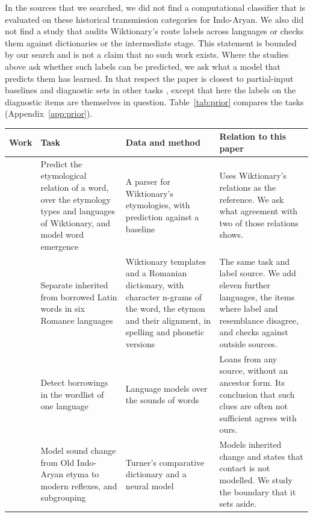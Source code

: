 \documentclass[11pt]{article}
\begin{document}
In the sources that we searched, we did not find a computational classifier that is evaluated on these historical transmission categories for Indo-Aryan. We also did not find a study that audits Wiktionary's route labels across languages or checks them against dictionaries or the intermediate stage. This statement is bounded by our search and is not a claim that no such work exists. Where the studies above ask whether such labels can be predicted, we ask what a model that predicts them has learned. In that respect the paper is closest to partial-input baselines and diagnostic sets in other tasks \citep{poliak2018hypothesis,mccoy2019right}, except that here the labels on the diagnostic items are themselves in question. Table~\ref{tab:prior} compares the tasks (Appendix~\ref{app:prior}).

\begin{table}[t]
\centering\footnotesize
\begin{tabular}{p{}p{}p{}p{}}
\toprule
\textbf{Work} & \textbf{Task} & \textbf{Data and method} & \textbf{Relation to this paper} \\
\midrule
\citet{wu2020computational} & Predict the etymological relation of a word, over the etymology types and languages of Wiktionary, and model word emergence & A parser for Wiktionary's etymologies, with prediction against a baseline & Uses Wiktionary's relations as the reference. We ask what agreement with two of those relations shows. \\
\addlinespace
\citet{cristea2021inherited} & Separate inherited from borrowed Latin words in six Romance languages & Wiktionary templates and a Romanian dictionary, with character n-grams of the word, the etymon and their alignment, in spelling and phonetic versions & The same task and label source. We add eleven further languages, the items where label and resemblance disagree, and checks against outside sources. \\
\addlinespace
\citet{miller2020lexical} & Detect borrowings in the wordlist of one language & Language models over the sounds of words & Loans from any source, without an ancestor form. Its conclusion that such clues are often not sufficient agrees with ours. \\
\addlinespace
\citet{cathcart2020disentangling} & Model sound change from Old Indo-Aryan etyma to modern reflexes, and subgrouping & Turner's comparative dictionary and a neural model & Models inherited change and states that contact is not modelled. We study the boundary that it sets aside. \\

\end{tabular}
\end{table}
\end{document}
